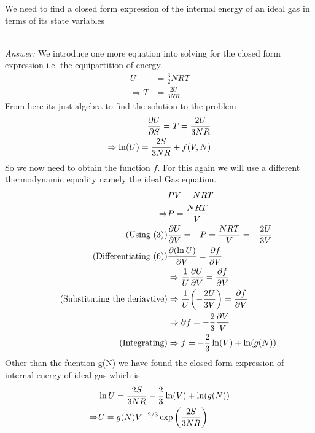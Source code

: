     \begin{problem}
      We need to find a closed form expression of the internal energy of an ideal gas in terms 
      of its state variables
    \end{problem}

    \\[5]
    \emph{Answer: } We introduce one more equation into solving for the closed form expression i.e. the 
    equipartition of energy.
    \begin{align}
        U &= \frac{3}{2} NRT \nonumber\\ 
        \Rightarrow T & = \frac{2U}{3NR} 
    \end{align}
    From here its just algebra to find the solution to the problem
    \begin{align}
        \pdv{U}{S} = T = \frac{2U}{3NR}\nonumber\\ 
        \Rightarrow \ln (U) = \frac{2S}{3NR}+ f(V,N) 
    \end{align}
    So we now need to obtain the function \(f\). For this again we will use a different 
    thermodynamic equality namely the ideal Gas equation.
    \begin{align*}
        & PV = NRT\\
        \Rightarrow & P = \frac{NRT}{V}\\ 
        \tag{Using (3)}
        & \pdv{U}{V} = -P = \frac{NRT}{V} = -\frac{2U}{3V} \\ 
        \tag{Differentiating (6)}
        & \pdv{(\ln U)}{V} = \pdv{f}{V} \\ 
        &\Rightarrow \frac{1}{U}\pdv{U}{V} = \pdv{f}{V}\\ 
        \tag{Substituting the deriavtive}
        &\Rightarrow \frac{1}{U} \qty(-\frac{2U}{3V}) = \pdv{f}{V} \\ 
        & \Rightarrow \partial{f} = -\frac{2}{3} \frac{\partial{V}}{V} \\ 
        \tag{Integrating}
        & \Rightarrow f = -\frac{2}{3} \ln(V) + \ln(g(N))
    \end{align*} 
    Other than the fucntion g(N) we have found the closed form expression of internal energy of 
    ideal gas which is
    \begin{align}
        &\ln U = \frac{2S}{3NR} - \frac{2}{3} \ln(V) + \ln(g(N)) \nonumber\\ 
        \Rightarrow & U = g(N)V^{-2/3}\exp\qty(\frac{2S}{3NR})  
    \end{align}
